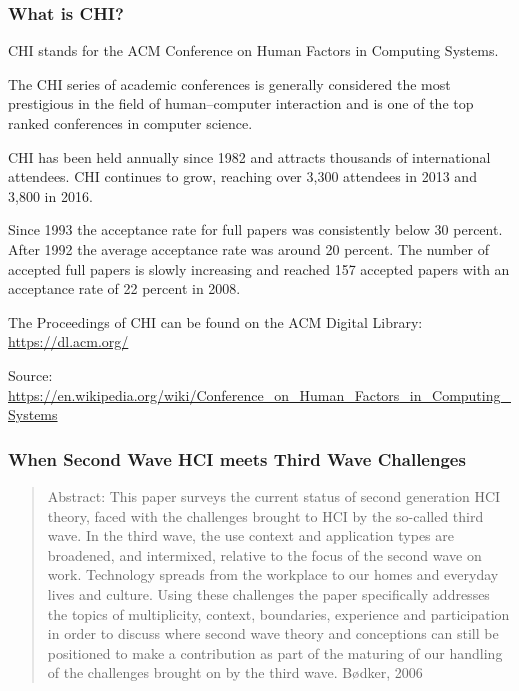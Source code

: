 \documentclass[screen, aspectratio=43]{beamer}
\begin{document}
%
%
\begin{frame}
\frametitle{What is CHI?}
\begin{itemize}
{\small
\item CHI stands for the ACM Conference on Human Factors in Computing Systems.
\item The CHI series of academic conferences is generally considered the most prestigious in the field of human–computer interaction and is one of the top ranked conferences in computer science.
\item CHI has been held annually since 1982 and attracts thousands of international attendees. CHI continues to grow, reaching over 3,300 attendees in 2013 and 3,800 in 2016.
\item Since 1993 the acceptance rate for full papers was consistently below 30 percent. After 1992 the average acceptance rate was around 20 percent. The number of accepted full papers is slowly increasing and reached 157 accepted papers with an acceptance rate of 22 percent in 2008.
\item The Proceedings of CHI can be found on the ACM Digital Library: \url{https://dl.acm.org/}
}
\end{itemize}
{\small Source: \url{https://en.wikipedia.org/wiki/Conference_on_Human_Factors_in_Computing_Systems}}
\end{frame}
%
\begin{frame}
\frametitle{When Second Wave HCI meets Third Wave Challenges}
\begin{quote}
Abstract: This paper surveys the current status of second generation HCI theory, faced with the 
challenges brought to HCI by the so-called third wave. In the third wave, the use context and application types are broadened, and intermixed, relative to the focus of the second wave on work. Technology spreads from the workplace to our homes and everyday lives and culture. Using these challenges the paper specifically addresses the topics of multiplicity, context, boundaries, experience and participation in order to discuss where second wave theory and conceptions can still be positioned to make a contribution as part of the maturing of our handling of the challenges brought on by the third wave. Bødker, 2006 \cite{Bodker.2006.second}
\end{quote}
\end{frame}
\end{document}
